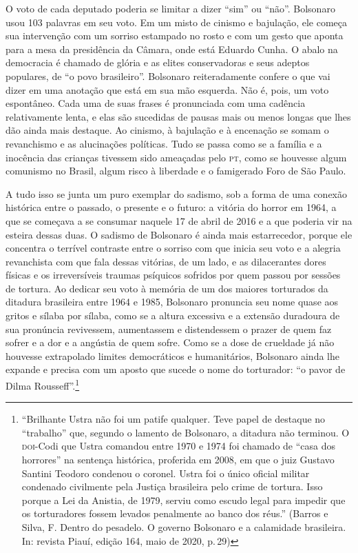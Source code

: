 O voto de cada deputado poderia se limitar a dizer ``sim'' ou ``não''.
Bolsonaro usou 103 palavras em seu voto. Em um misto de cinismo e
bajulação, ele começa sua intervenção com um sorriso estampado no rosto
e com um gesto que aponta para a mesa da presidência da Câmara, onde
está Eduardo Cunha. O abalo na democracia é chamado de glória e as
elites conservadoras e seus adeptos populares, de ``o povo brasileiro''.
Bolsonaro reiteradamente confere o que vai dizer em uma anotação que
está em sua mão esquerda. Não é, pois, um voto espontâneo. Cada uma de
suas frases é pronunciada com uma cadência relativamente lenta, e elas
são sucedidas de pausas mais ou menos longas que lhes dão ainda mais
destaque. Ao cinismo, à bajulação e à encenação se somam o revanchismo e
as alucinações políticas. Tudo se passa como se a família e a inocência
das crianças tivessem sido ameaçadas pelo \textsc{pt}, como se houvesse algum
comunismo no Brasil, algum risco à liberdade e o famigerado Foro de São
Paulo.

A tudo isso se junta um puro exemplar do sadismo, sob a forma de uma
conexão histórica entre o passado, o presente e o futuro: a vitória do
horror em 1964, a que se começava a se consumar naquele 17 de abril de
2016 e a que poderia vir na esteira dessas duas. O sadismo de Bolsonaro
é ainda mais estarrecedor, porque ele concentra o terrível contraste
entre o sorriso com que inicia seu voto e a alegria revanchista com que
fala dessas vitórias, de um lado, e as dilacerantes dores físicas e os
irreversíveis traumas psíquicos sofridos por quem passou por sessões de
tortura. Ao dedicar seu voto à memória de um dos maiores torturados da
ditadura brasileira entre 1964 e 1985, Bolsonaro pronuncia seu nome
quase aos gritos e sílaba por sílaba, como se a altura excessiva e a
extensão duradoura de sua pronúncia revivessem, aumentassem e
distendessem o prazer de quem faz sofrer e a dor e a angústia de quem
sofre. Como se a dose de crueldade já não houvesse extrapolado limites
democráticos e humanitários, Bolsonaro ainda lhe expande e precisa com
um aposto que sucede o nome do torturador: ``o pavor de Dilma
Rousseff''.\footnote{``Brilhante Ustra não foi um patife qualquer. Teve
  papel de destaque no ``trabalho'' que, segundo o lamento de Bolsonaro,
  a ditadura não terminou. O \textsc{doi}-Codi que Ustra comandou entre 1970 e
  1974 foi chamado de ``casa dos horrores'' na sentença histórica,
  proferida em 2008, em que o juiz Gustavo Santini Teodoro condenou o
  coronel. Ustra foi o único oficial militar condenado civilmente pela
  Justiça brasileira pelo crime de tortura. Isso porque a Lei da
  Anistia, de 1979, serviu como escudo legal para impedir que os
  torturadores fossem levados penalmente ao banco dos réus.'' (Barros e
  Silva, F. Dentro do pesadelo. O governo Bolsonaro e a calamidade
  brasileira. In: revista Piauí, edição 164, maio de 2020, p.\,29)}

